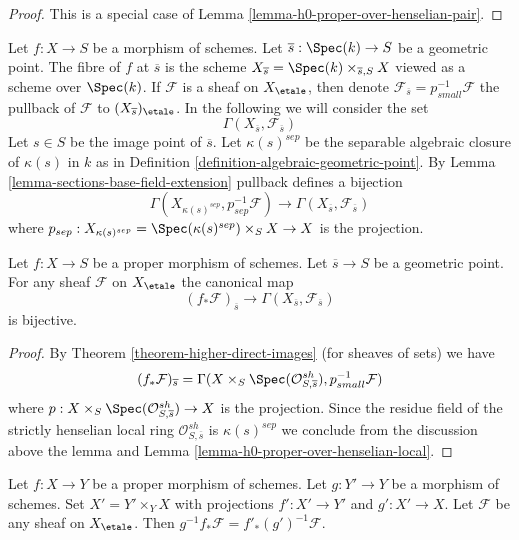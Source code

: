 \begin{proof}
This is a special case of Lemma \ref{lemma-h0-proper-over-henselian-pair}.
\end{proof}

\noindent
Let $f : X \to S$ be a morphism of schemes. Let
$\overline{s} : \Spec(k) \to S$ be a geometric point. The fibre
of $f$ at $\overline{s}$ is the scheme
$X_{\overline{s}} = \Spec(k) \times_{\overline{s}, S} X$ viewed
as a scheme over $\Spec(k)$. If $\mathcal{F}$ is a sheaf on
$X_\etale$, then denote
$\mathcal{F}_{\overline{s}} = p_{small}^{-1}\mathcal{F}$
the pullback of $\mathcal{F}$ to $(X_{\overline{s}})_\etale$.
In the following we will consider the set
$$
\Gamma(X_{\overline{s}}, \mathcal{F}_{\overline{s}})
$$
Let $s \in S$ be the image point of $\overline{s}$. Let $\kappa(s)^{sep}$
be the separable algebraic closure of $\kappa(s)$ in $k$ as in
Definition \ref{definition-algebraic-geometric-point}.
By Lemma \ref{lemma-sections-base-field-extension}
pullback defines a bijection
$$
\Gamma(X_{\kappa(s)^{sep}},
p_{sep}^{-1} \mathcal{F})
\longrightarrow
\Gamma(X_{\overline{s}}, \mathcal{F}_{\overline{s}})
$$
where $p_{sep} : X_{\kappa(s)^{sep}} = \Spec(\kappa(s)^{sep}) \times_S X \to X$
is the projection.

\begin{lemma}
\label{lemma-proper-pushforward-stalk}
Let $f : X \to S$ be a proper morphism of schemes. Let
$\overline{s} \to S$ be a geometric point.
For any sheaf $\mathcal{F}$ on $X_\etale$
the canonical map
$$
(f_*\mathcal{F})_{\overline{s}} \longrightarrow
\Gamma(X_{\overline{s}}, \mathcal{F}_{\overline{s}})
$$
is bijective.
\end{lemma}

\begin{proof}
By Theorem \ref{theorem-higher-direct-images} (for sheaves of sets)
we have
$$
(f_*\mathcal{F})_{\overline{s}} =
\Gamma(X \times_S \Spec(\mathcal{O}_{S, \overline{s}}^{sh}),
p_{small}^{-1}\mathcal{F})
$$
where $p : X \times_S \Spec(\mathcal{O}_{S, \overline{s}}^{sh}) \to X$
is the projection. Since the residue field of the strictly henselian
local ring $\mathcal{O}_{S, \overline{s}}^{sh}$ is $\kappa(s)^{sep}$
we conclude from the discussion above the lemma and
Lemma \ref{lemma-h0-proper-over-henselian-local}.
\end{proof}

\begin{lemma}
\label{lemma-proper-base-change-f-star}
Let $f : X \to Y$ be a proper morphism of schemes. Let $g : Y' \to Y$
be a morphism of schemes. Set $X' = Y' \times_Y X$ with projections
$f' : X' \to Y'$ and $g' : X' \to X$. Let $\mathcal{F}$ be any sheaf on
$X_\etale$. Then $g^{-1}f_*\mathcal{F} = f'_*(g')^{-1}\mathcal{F}$.
\end{lemma}

